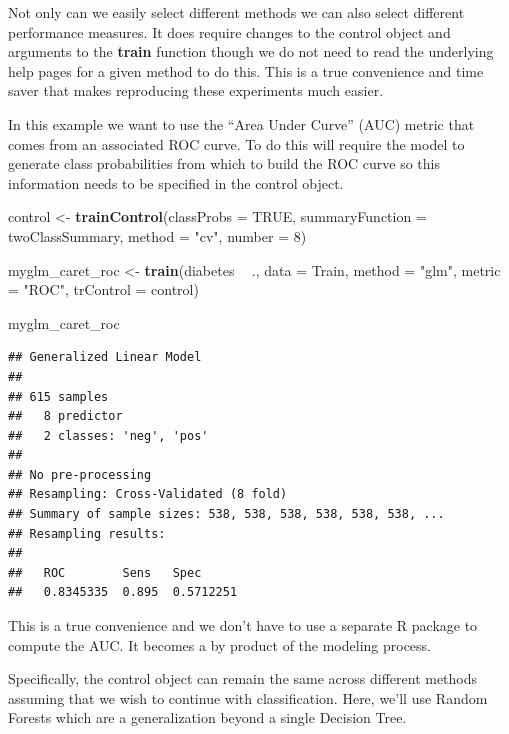 \documentclass[]{book}
\newenvironment{Shaded}{\begin{snugshade}}{\end{snugshade}}
\newcommand{\KeywordTok}[1]{\textcolor[rgb]{0.13,0.29,0.53}{\textbf{#1}}}
\newcommand{\DataTypeTok}[1]{\textcolor[rgb]{0.13,0.29,0.53}{#1}}
\newcommand{\DecValTok}[1]{\textcolor[rgb]{0.00,0.00,0.81}{#1}}
\newcommand{\StringTok}[1]{\textcolor[rgb]{0.31,0.60,0.02}{#1}}
\newcommand{\OtherTok}[1]{\textcolor[rgb]{0.56,0.35,0.01}{#1}}
\newcommand{\OperatorTok}[1]{\textcolor[rgb]{0.81,0.36,0.00}{\textbf{#1}}}
\newcommand{\NormalTok}[1]{#1}
\begin{document}
Not only can we easily select different methods we can also select
different performance measures. It does require changes to the control
object and arguments to the \textbf{train} function though we do not
need to read the underlying help pages for a given method to do this.
This is a true convenience and time saver that makes reproducing these
experiments much easier.

In this example we want to use the ``Area Under Curve'' (AUC) metric
that comes from an associated ROC curve. To do this will require the
model to generate class probabilities from which to build the ROC curve
so this information needs to be specified in the control object.

\begin{Shaded}
\begin{Highlighting}[]
\NormalTok{control <-}\StringTok{ }\KeywordTok{trainControl}\NormalTok{(}\DataTypeTok{classProbs =} \OtherTok{TRUE}\NormalTok{,}
                        \DataTypeTok{summaryFunction =}\NormalTok{ twoClassSummary,}
                        \DataTypeTok{method =} \StringTok{"cv"}\NormalTok{,}
                        \DataTypeTok{number =} \DecValTok{8}\NormalTok{)}

\NormalTok{myglm_caret_roc <-}\StringTok{ }\KeywordTok{train}\NormalTok{(diabetes }\OperatorTok{~}\StringTok{ }\NormalTok{.,}
                         \DataTypeTok{data =}\NormalTok{ Train,}
                         \DataTypeTok{method =} \StringTok{"glm"}\NormalTok{,}
                         \DataTypeTok{metric =} \StringTok{"ROC"}\NormalTok{,}
                         \DataTypeTok{trControl =}\NormalTok{ control)}

\NormalTok{myglm_caret_roc}
\end{Highlighting}
\end{Shaded}

\begin{verbatim}
## Generalized Linear Model 
## 
## 615 samples
##   8 predictor
##   2 classes: 'neg', 'pos' 
## 
## No pre-processing
## Resampling: Cross-Validated (8 fold) 
## Summary of sample sizes: 538, 538, 538, 538, 538, 538, ... 
## Resampling results:
## 
##   ROC        Sens   Spec     
##   0.8345335  0.895  0.5712251
\end{verbatim}

This is a true convenience and we don't have to use a separate R package
to compute the AUC. It becomes a by product of the modeling process.

Specifically, the control object can remain the same across different
methods assuming that we wish to continue with classification. Here,
we'll use Random Forests which are a generalization beyond a single
Decision Tree.
\end{document}
